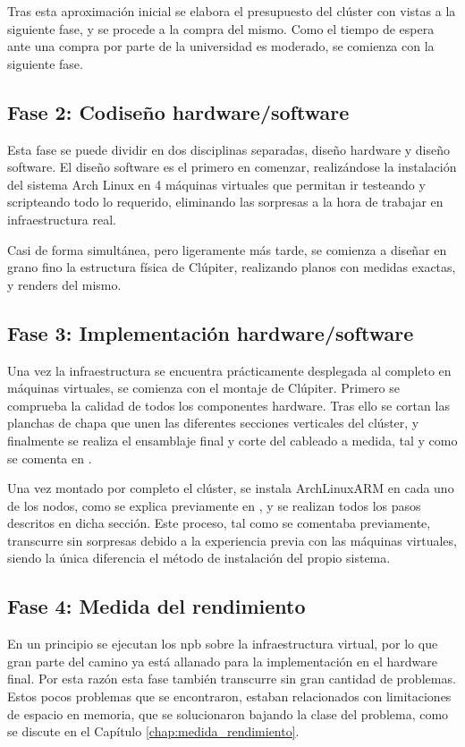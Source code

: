 Tras esta aproximación inicial se elabora el presupuesto del clúster con vistas a la siguiente fase, y se procede a la compra del mismo. Como el tiempo de espera ante una compra por parte de la universidad es moderado, se comienza con la siguiente fase.

\subsection{Fase 2: Codiseño hardware/software}
Esta fase se puede dividir en dos disciplinas separadas, diseño hardware y diseño software. El diseño software es el primero en comenzar, realizándose la instalación del sistema Arch Linux en 4 máquinas virtuales que permitan ir testeando y scripteando todo lo requerido, eliminando las sorpresas a la hora de trabajar en infraestructura real.

Casi de forma simultánea, pero ligeramente más tarde, se comienza a diseñar en grano fino la estructura física de Clúpiter, realizando planos con medidas exactas, y renders del mismo.

\subsection{Fase 3: Implementación hardware/software}
Una vez la infraestructura se encuentra prácticamente desplegada al completo en máquinas virtuales, se comienza con el montaje de Clúpiter. Primero se comprueba la calidad de todos los componentes hardware. Tras ello se cortan las planchas de chapa que unen las diferentes secciones verticales del clúster, y finalmente se realiza el ensamblaje final y corte del cableado a medida, tal y como se comenta en .

Una vez montado por completo el clúster, se instala ArchLinuxARM en cada uno de los nodos, como se explica previamente en , y se realizan todos los pasos descritos en dicha sección. Este proceso, tal como se comentaba previamente, transcurre sin sorpresas debido a la experiencia previa con las máquinas virtuales, siendo la única diferencia el método de instalación del propio sistema.

\subsection{Fase 4: Medida del rendimiento}
En un principio se ejecutan los \acrlong{npb} sobre la infraestructura virtual, por lo que gran parte del camino ya está allanado para la implementación en el hardware final. Por esta razón esta fase también transcurre sin gran cantidad de problemas. Estos pocos problemas que se encontraron, estaban relacionados con limitaciones de espacio en memoria, que se solucionaron bajando la clase del problema, como se discute en el Capítulo \ref{chap:medida_rendimiento}.

